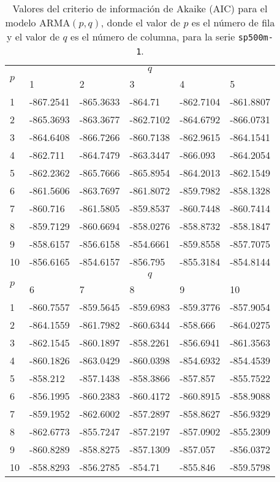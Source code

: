 \documentclass{article}
\begin{document}
\begin{table}[H]
\centering
\begin{tabularx}{0.9\textwidth}{YYYYYY}
\toprule
{} &  \\
& 1 & 2 & 3 & 4 & 5 \\
1 & -867.2541&-865.3633&-864.71&-862.7104&-861.8807 \\
2 & -865.3693&-863.3677&-862.7102&-864.6792&-866.0731 \\
3 & -864.6408&-866.7266&-860.7138&-862.9615&-864.1541 \\
4 & -862.711&-864.7479&-863.3447&-866.093&-864.2054 \\
5 & -862.2362&-865.7666&-865.8954&-864.2013&-862.1549 \\
6 & -861.5606&-863.7697&-861.8072&-859.7982&-858.1328 \\
7 & -860.716&-861.5805&-859.8537&-860.7448&-860.7414 \\
8 & -859.7129&-860.6694&-858.0276&-858.8732&-858.1847 \\
9 & -858.6157&-856.6158&-854.6661&-859.8558&-857.7075 \\
10 & -856.6165&-854.6157&-856.795&-855.3184&-854.8144 \\
\midrule
{} &  \\
& 6 & 7 & 8 & 9 & 10 \\
1 & -860.7557&-859.5645&-859.6983&-859.3776&-857.9054 \\
2 & -864.1559&-861.7982&-860.6344&-858.666&-864.0275 \\
3 & -862.1545&-860.1897&-858.2261&-856.6941&-861.3563 \\
4 & -860.1826&-863.0429&-860.0398&-854.6932&-854.4539 \\
5 & -858.212&-857.1438&-858.3866&-857.857&-855.7522 \\
6 & -856.1995&-860.2383&-860.4172&-860.8915&-858.9088 \\
7 & -859.1952&-862.6002&-857.2897&-858.8627&-856.9329 \\
8 & -862.6773&-855.7247&-857.2197&-857.0902&-855.2309 \\
9 & -860.8289&-858.8275&-857.1309&-857.057&-856.0372 \\
10 & -858.8293&-856.2785&-854.71&-855.846&-859.5798 \\
\bottomrule
\end{tabularx}
\caption{\label{tab:akaike-m}Valores del criterio de información de Akaike (AIC) para el modelo $\mathrm{ARMA}(p, q)$, donde el valor de $p$ es el número de fila y el valor de $q$ es el número de columna, para la serie \texttt{sp500m-1}.}
\end{table}
\end{document}

